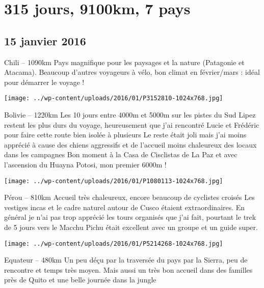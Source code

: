 \chapter{315 jours, 9100km, 7 pays}
\section*{15 janvier 2016}
Chili – 1090km \newline
 Pays magnifique pour les paysages et la nature (Patagonie et Atacama). Beaucoup d'autres voyageurs à vélo, bon climat en février/mars : idéal pour démarrer le voyage ! \newline
 \newline
\centerline{\texttt{[image: ../wp-content/uploads/2016/01/P3152810-1024x768.jpg]} } 
 \newline
 Bolivie – 1220km \newline
 Les 10 jours entre 4000m et 5000m sur les pistes du Sud Lipez restent les plus durs du voyage, heureusement que j'ai rencontré Lucie et Frédéric pour faire cette route bien isolée à plusieurs \newline
 Le reste était joli mais j'ai moins apprécié à cause des chiens aggressifs et de l'accueil moins chaleureux des locaux dans les campagnes \newline
 Bon moment à la Casa de Cisclistas de La Paz et avec l'ascension du Huayna Potosi, mon premier 6000m ! \newline
 \newline
\centerline{\texttt{[image: ../wp-content/uploads/2016/01/P1080113-1024x768.jpg]} } 
 \newline
 Pérou – 810km \newline
 Accueil très chaleureux, encore beaucoup de cyclistes croisés \newline
 Les vestiges incas et le cadre naturel autour de Cusco étaient extraordinaires. \newline
 En général je n'ai pas trop apprécié les tours organisés que j'ai fait, pourtant le trek de 5 jours vers le Macchu Pichu était excellent avec un groupe et un guide super. \newline
 \newline
\centerline{\texttt{[image: ../wp-content/uploads/2016/01/P5214268-1024x768.jpg]} } 
 \newline
 Equateur – 480km \newline
 Un peu déçu par la traversée du pays par la Sierra, peu de rencontre et temps très moyen. Mais aussi un très bon accueil dans des familles près de Quito et une belle journée dans la jungle \newline
